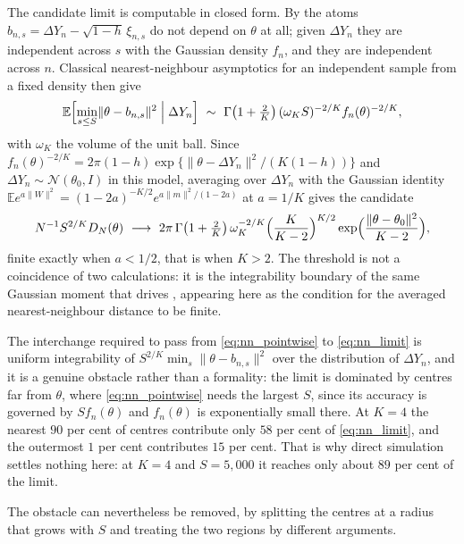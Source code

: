 \documentclass[11pt]{article}
\theoremstyle{definition}
\newcommand{\E}{\mathbb{E}}
\newcommand{\Normal}{\mathcal{N}}
\newcommand{\thetao}{\theta_0}
\begin{document}
The candidate limit is computable in closed form. By  the atoms $b_{n,s}=\Delta Y_n-\sqrt{1-h}\,\xi_{n,s}$ do not depend on $\theta$ at all; given $\Delta Y_n$ they are independent across $s$ with the Gaussian density $f_n$, and they are independent across $n$. Classical nearest-neighbour asymptotics for an independent sample from a fixed density then give
\begin{equation}\label{eq:nn_pointwise}
\E\Bigl[\min_{s\le S}\lVert\theta-b_{n,s}\rVert^2\;\Big|\;\Delta Y_n\Bigr]
\ \sim\ \Gamma\bigl(1+\tfrac2K\bigr)\,(\omega_KS)^{-2/K}f_n(\theta)^{-2/K},
\end{equation}
with $\omega_K$ the volume of the unit ball. Since $f_n(\theta)^{-2/K}=2\pi(1-h)\exp\{\lVert\theta-\Delta Y_n\rVert^2/(K(1-h))\}$ and $\Delta Y_n\sim\Normal(\thetao,I)$ in this model, averaging over $\Delta Y_n$ with the Gaussian identity $\E e^{a\lVert W\rVert^2}=(1-2a)^{-K/2}e^{a\lVert m\rVert^2/(1-2a)}$ at $a=1/K$ gives the candidate
\begin{equation}\label{eq:nn_limit}
N^{-1}S^{2/K}D_N(\theta)
\ \longrightarrow\
2\pi\,\Gamma\bigl(1+\tfrac2K\bigr)\,\omega_K^{-2/K}\Bigl(\frac{K}{K-2}\Bigr)^{K/2}
\exp\Bigl(\frac{\lVert\theta-\thetao\rVert^2}{K-2}\Bigr),
\end{equation}
finite exactly when $a<1/2$, that is when $K>2$. The threshold is not a coincidence of two calculations: it is the integrability boundary of the same Gaussian moment that drives , appearing here as the condition for the averaged nearest-neighbour distance to be finite.

The interchange required to pass from \eqref{eq:nn_pointwise} to \eqref{eq:nn_limit} is uniform integrability of $S^{2/K}\min_s\lVert\theta-b_{n,s}\rVert^2$ over the distribution of $\Delta Y_n$, and it is a genuine obstacle rather than a formality: the limit is dominated by centres far from $\theta$, where \eqref{eq:nn_pointwise} needs the largest $S$, since its accuracy is governed by $Sf_n(\theta)$ and $f_n(\theta)$ is exponentially small there. At $K=4$ the nearest $90$ per cent of centres contribute only $58$ per cent of \eqref{eq:nn_limit}, and the outermost $1$ per cent contributes $15$ per cent. That is why direct simulation settles nothing here: at $K=4$ and $S=5{,}000$ it reaches only about $89$ per cent of the limit.

The obstacle can nevertheless be removed, by splitting the centres at a radius that grows with $S$ and treating the two regions by different arguments.
\end{document}
